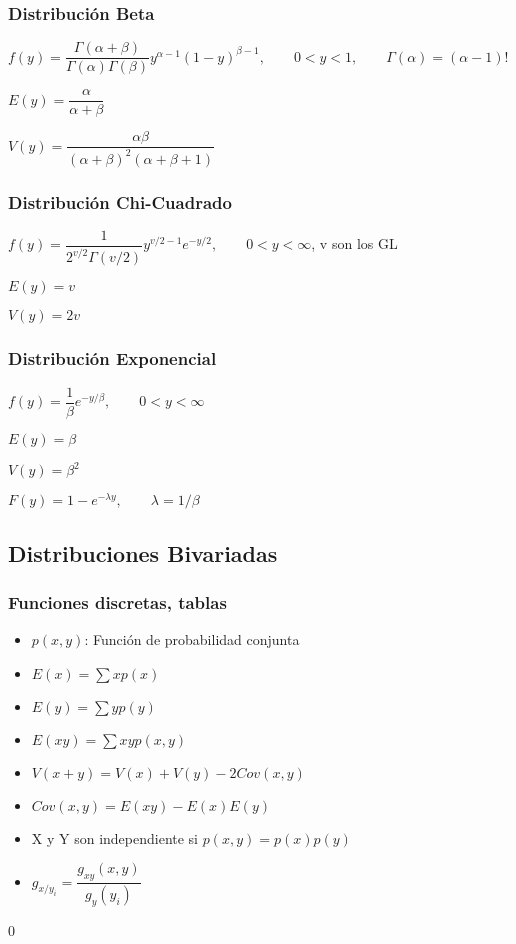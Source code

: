 \subsubsection{Distribución Beta}
$f(y)=\dfrac{\Gamma(\alpha+\beta)}{\Gamma(\alpha)\Gamma(\beta)}y^{\alpha-1}(1-y)^{\beta-1}, \qquad 0<y<1, \qquad\Gamma(\alpha)=(\alpha-1)!$

$E(y)=\dfrac{\alpha}{\alpha+\beta}$

$V(y)=\dfrac{\alpha\beta}{(\alpha+\beta)^2(\alpha+\beta+1)}$

\subsubsection{Distribución Chi-Cuadrado}
$f(y)=\dfrac{1}{2^{v/2}\Gamma(v/2)}y^{v/2-1}e^{-y/2},\qquad 0<y<\infty$, v son los GL

$E(y)=v$

$V(y)=2v$

\subsubsection{Distribución Exponencial}
$f(y)=\dfrac{1}{\beta}e^{-y/\beta},\qquad 0<y<\infty$

$E(y)=\beta$

$V(y)=\beta^2$

$F(y)=1-e^{-\lambda y},\qquad \lambda=1/\beta$


\subsection{Distribuciones Bivariadas}
\subsubsection{Funciones discretas, tablas}

\begin{itemize}
	\item $p(x,y)$: Función de probabilidad conjunta
	\item $E(x)=\sum xp(x)$
	\item $E(y)=\sum yp(y)$
	\item $E(xy)=\sum xyp(x,y)$
	\item $V(x+y)=V(x)+V(y)-2Cov(x,y)$
	\item $Cov(x,y)=E(xy)-E(x)E(y)$ 
	\item X y Y son independiente si $p(x,y) = p(x)p(y)$
	\item $g_{x/y_i}=\dfrac{g_{xy}(x,y)}{g_y(y_i)}$
\end{itemize}
0
